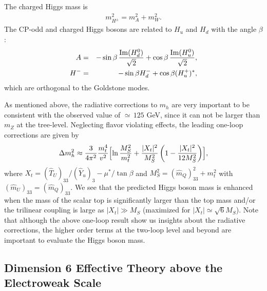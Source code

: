 \documentclass[preprint,3p,12pt]{elsarticle}
\begin{document}
The charged Higgs mass is 
\begin{eqnarray}
m_{H^{\pm}}^2 = m_A^2 + m_W^2.
\end{eqnarray}
The CP-odd and charged Higgs bosons are related to $H_u$ and $H_d$ with the angle $\beta$:
\begin{eqnarray}
A &=& -\sin\beta \, \frac{{\rm Im}(H_d^0)}{\sqrt{2}} + \cos\beta \, \frac{{\rm Im}(H_u^0)}{\sqrt{2}}, \nonumber \\
H^{-} &=& -\sin\beta H_d^- + \cos\beta (H_u^+)^*, 
\end{eqnarray}
which are orthogonal to the Goldstone modes.


\vspace{10pt}
As mentioned above, 
the radiative corrections to $m_h$ are very important to be consistent with the observed value of $\simeq\, 125$ GeV, 
since it can not be larger than $m_Z$ at the tree-level. Neglecting flavor violating effects, the leading one-loop corrections are given by~\cite{Okada:1990vk, Ellis:1990nz, Haber:1990aw}
\begin{eqnarray}
\Delta m_h^2 \approx \frac{3}{4\pi^2} \frac{m_t^4}{v^2} \Bigl[
\ln  \frac{M_S^2}{m_t^2}  
+ \frac{|X_t|^2}{M_S^2} \left(1 - \frac{|X_t|^2}{12 M_S^2} \right)
\Bigr],
\end{eqnarray}
where $X_t = (\hat T_U)_{33}/ (\hat Y_u)_3 - \mu^*/\tan\beta $ and $M_S^2 = (\hat m_{Q})_{33}^2 + m_t^2$ with $(\hat m_{U})_{33} = (\hat m_{Q})_{33}$. 
We see that the predicted Higgs boson mass is enhanced when the mass of the scalar top is significantly larger than the top mass and/or the trilinear coupling is large as $|X_t| \gg M_S$ (maximized for $|X_t| \simeq \sqrt{6} M_S$). 
Note that although the above one-loop result show us insights about the radiative corrections, 
the higher order terms at the two-loop level and beyond are important to evaluate the Higgs boson mass.


\subsection{Dimension 6 Effective Theory above the Electroweak Scale }
\label{sec:Dim6}
\end{document}
